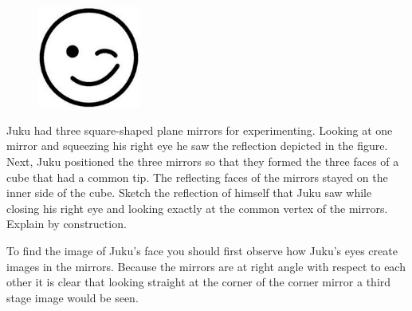 \begin{figure}
	\vspace{-25pt}
	\begin{center}
		\includegraphics[width=0.3\textwidth]{2016-v3g-08-wink}
	\end{center}
	\vspace{-20pt}
\end{figure}
Juku had three square-shaped plane mirrors for experimenting. Looking at one mirror and squeezing his right eye he saw the reflection depicted in the figure. Next, Juku positioned the three mirrors so that they formed the three faces of a cube that had a common tip. The reflecting faces of the mirrors stayed on the inner side of the cube. Sketch the reflection of himself that Juku saw while closing his right eye and looking exactly at the common vertex of the mirrors. Explain by construction.

\hinteng
To find the image of Juku’s face you should first observe how Juku’s eyes create images in the mirrors. Because the mirrors are at right angle with respect to each other it is clear that looking straight at the corner of the corner mirror a third stage image would be seen.

